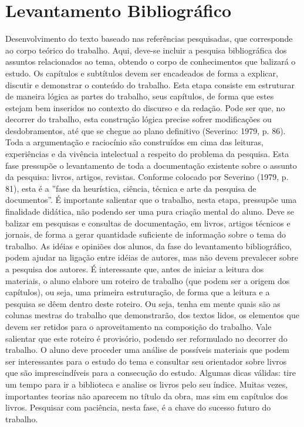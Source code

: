 \chapter{Levantamento Bibliográfico}
Desenvolvimento do texto baseado nas referências pesquisadas, que corresponde ao corpo teórico do trabalho. Aqui, deve-se incluir a pesquisa bibliográfica dos assuntos relacionados ao tema, obtendo o corpo de conhecimentos que balizará o estudo. Os capítulos e subtítulos devem ser encadeados de forma a explicar, discutir e demonstrar o conteúdo do trabalho.
Esta etapa consiste em estruturar de maneira lógica as partes do trabalho, seus capítulos, de forma que estes estejam bem inseridos no contexto do discurso e da redação. Pode ser que, no decorrer do trabalho, esta construção lógica precise sofrer modificações ou desdobramentos, até que se chegue ao plano definitivo (Severino: 1979, p. 86). Toda a argumentação e raciocínio são construídos em cima das leituras, experiências e da vivência intelectual a respeito do problema da pesquisa.
Esta fase pressupõe o levantamento de toda a documentação existente sobre o assunto da pesquisa: livros, artigos, revistas. Conforme colocado por Severino (1979, p. 81), esta é a ”fase da heurística, ciência, técnica e arte da pesquisa de documentos”. 
É importante salientar que o trabalho, nesta etapa, pressupõe uma finalidade didática, não podendo ser uma pura criação mental do aluno. Deve se balizar em pesquisas e consultas de documentação, em livros, artigos técnicos e jornais, de forma a gerar quantidade suficiente de informação sobre o tema do trabalho. As idéias e opiniões dos alunos, da fase do levantamento bibliográfico, podem ajudar na ligação entre idéias de autores, mas não devem prevalecer sobre a pesquisa dos autores. 
É interessante que, antes de iniciar a leitura dos materiais, o aluno elabore um roteiro de trabalho (que podem ser a origem dos capítulos), ou seja, uma primeira estruturação, de forma que a leitura e a pesquisa se dêem dentro deste roteiro. Ou seja, tenha em mente quais são as colunas mestras do trabalho que demonstrarão, dos textos lidos, os elementos que devem ser retidos para o aproveitamento na composição do trabalho. Vale salientar que este roteiro é provisório, podendo ser reformulado no decorrer do trabalho.
O aluno deve proceder uma análise de possíveis materiais que podem ser interessantes para o estudo do tema e consultar seu orientador sobre livros que são imprescindíveis para a consecução do estudo. Algumas dicas válidas: tire um tempo para ir a biblioteca e analise os livros pelo seu índice. Muitas vezes, importantes teorias não aparecem no título da obra, mas sim em capítulos dos livros. Pesquisar com paciência, nesta fase, é a chave do sucesso futuro do trabalho. 
